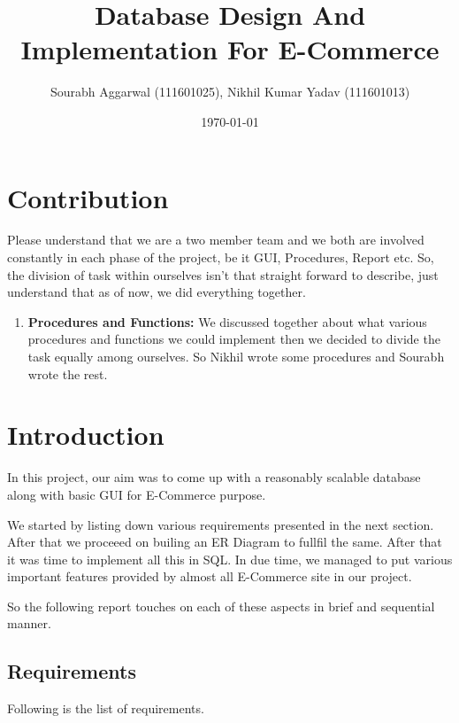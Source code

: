 \documentclass[a4paper,12pt]{article}
\newcommand{\bfa}[1]{
    \textbf{#1}
}
\begin{document}
\title{Database Design And Implementation For E-Commerce}
\author{\small{Sourabh Aggarwal (111601025), Nikhil Kumar Yadav (111601013)}}
\date{\today}
\maketitle
{}
\tableofcontents
\newpage
{}
\section{Contribution}
Please understand that we are a two member team and we both are involved constantly in each phase of the project, be it GUI, Procedures, Report etc. So, the division of task within ourselves isn't that straight forward to describe, just understand that as of now, we did everything together.
\begin{enumerate}
  \item \bfa{Procedures and Functions:}We discussed together about what various procedures and functions we could implement then we decided to divide the task equally among ourselves. So Nikhil wrote some procedures and Sourabh wrote the rest.
\end{enumerate}
\section{Introduction}
In this project, our aim was to come up with a reasonably scalable database along with basic GUI for E-Commerce purpose.

We started by listing down various requirements presented in the next section. After that we proceeed on builing an ER Diagram to fullfil the same. After that it was time to implement all this in SQL. In due time, we managed to put various important features provided by almost all E-Commerce site in our project. 

So the following report touches on each of these aspects in brief and sequential manner. 

\subsection{Requirements}
Following is the list of requirements.
\end{document}
